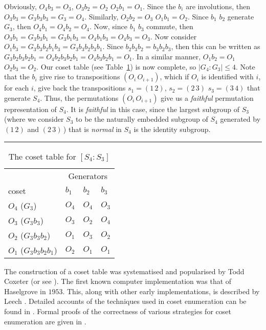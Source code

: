 Obviously, $O_4b_3=O_3$, $O_3b_2=O_2$ \amp $O_2b_1=O_1$.
Since the $b_i$ are involutions, then $O_3b_3=G_3b_3b_3=G_3=O_4$.
Similarly, $O_2b_2=O_3$ \amp $O_1b_1=O_2$.
Since $b_1$ \amp $b_2$ generate $G_3$, then $O_4b_1=O_4b_2=O_4$.
Now, since $b_1$ \amp $b_3$ commute, then 
  $O_3b_1=G_3b_3b_1=G_3b_1b_3=O_4b_1b_3=O_4b_3=O_3$.
Now consider $O_1b_3=G_3b_3b_2b_1b_3=G_3b_3b_2b_3b_1$.
Since $b_2b_3b_2=b_3b_2b_3$, then this can be written as 
  $G_3b_2b_3b_2b_1=O_4b_2b_3b_2b_1=O_4b_3b_2b_1=O_1$.
In a similar manner, $O_1b_2=O_1$ \amp $O_2b_3=O_2$.
Our coset table (see Table~\ref{tab:dic}) is now complete, so 
  $|G_4 : G_3| \le 4$.
Note that the $b_i$ give rise to transpositions $(O_i\,O_{i+1})$,
  which if $O_i$ is identified with $i$, for each $i$, give back the 
  transpositions $s_1=(1\,2)$, $s_2=(2\,3)$ \amp $s_3=(3\,4)$ that 
  generate $S_4$.
Thus, the permutations $(O_i\,O_{i+1})$ give us a \emph{faithful} permutation
  representation of $S_4$. 
It is \emph{faithful} in this case, since the largest subgroup of $S_3$ 
  (where we consider $S_3$ to be the naturally embedded subgroup of $S_4$
  generated by $(1\,2)$ and $(2\,3)$\,)
  that is \emph{normal} in $S_4$ is the identity subgroup.

\begin{table}
\hrule
\caption{The coset table for $[S_4:S_3]$}
\label{tab:dic}
\smallskip
\renewcommand{\arraystretch}{0.875}
\begin{tabular*}{\textwidth}{@{\extracolsep{\fill}}llll} 
\hline\hline
 & \multicolumn{3}{c}{Generators} \\
\cline{2-4}
coset                   & $b_1$ & $b_2$ & $b_3$ \\ 
\hline
 $O_4$ ($G_3$)          & $O_4$ & $O_4$ & $O_3$ \\
 $O_3$ ($G_3b_3$)       & $O_3$ & $O_2$ & $O_4$ \\
 $O_2$ ($G_3b_3b_2$)    & $O_1$ & $O_3$ & $O_2$ \\
 $O_1$ ($G_3b_3b_2b_1$) & $O_2$ & $O_1$ & $O_1$ \\
\hline\hline
\end{tabular*}
\end{table}

The construction of a coset table was systematised and popularised by Todd
  \amp Coxeter \cite{TC} (or see \cite[Chapter 2]{CM}).
The first known computer implementation was that of Haselgrove in $1953$.
This, along with other early implementations, is described by Leech
  \cite{Lee3}.
Detailed accounts of the techniques used in coset enumeration can be found
  in \cite{CDHW,Hav,Lee,Neu,Sim}.
Formal proofs of the correctness of various strategies for coset
  enumeration are given in \cite{Men,Neu,Sim}.

